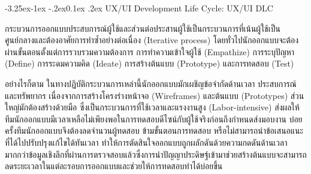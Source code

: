 \documentclass[a4paper,oneside]{cpe-thesis-th}
\makeatletter
\renewcommand\subsection{\@startsection{subsection}{2}{\z@}%
   {-3.25ex\@plus -1ex \@minus -.2ex}{0.1ex \@plus .2ex}%
   {\normalfont\thsz@subsection\bfseries}}
\newcommand{\thaijustify}[1]{%
  \par\hspace{30pt}\justifying
  #1
}
\makeatother
\begin{document}
\subsection{UX/UI Development Life Cycle: UX/UI DLC}
\thaijustify{
  กระบวนการออกแบบประสบการณ์ผู้ใช้และส่วนต่อประสานผู้ใช้เป็นกระบวนการที่เน้นผู้ใช้เป็นศูนย์กลางและต้องอาศัยการทำซ้ำอย่างต่อเนื่อง (Iterative process) โดยทั่วไปนักออกแบบจะต้องผ่านขั้นตอนตั้งแต่การรวบรวมความต้องการ การทำความเข้าใจผู้ใช้ (Empathize) การระบุปัญหา (Define) การระดมความคิด (Ideate) การสร้างต้นแบบ (Prototype) และการทดสอบ (Test)
} 
\thaijustify{อย่างไรก็ตาม ในทางปฏิบัติกระบวนการเหล่านี้นักออกแบบมักเผชิญข้อจำกัดด้านเวลา ประสบการณ์ และทรัพยากร เนื่องจากการสร้างโครงร่างหน้าจอ (Wireframes) และต้นแบบ (Prototypes) ส่วนใหญ่มักต้องสร้างด้วยมือ ซึ่งเป็นกระบวนการที่ใช้เวลาและแรงงานสูง (Labor-intensive) \cite{suh2025storyensemble} ส่งผลให้ทีมนักออกแบบมีเวลาเหลือไม่เพียงพอในการทดสอบดีไซน์กับผู้ใช้จริงก่อนถึงกำหนดส่งมอบงาน บ่อยครั้งทีมนักออกแบบจึงต้องลดจำนวนผู้ทดสอบ ข้ามขั้นตอนการทดสอบ หรือไม่สามารถนำข้อเสนอแนะที่ได้ไปปรับปรุงแก้ไขได้ทันเวลา ทำให้การตัดสินใจออกแบบถูกผลักดันด้วยความกดดันด้านเวลามากกว่าข้อมูลเชิงลึกที่ผ่านการตรวจสอบแล้วซึ่งการนำปัญญาประดิษฐ์เข้ามาช่วยสร้างต้นแบบจะสามารถลดระยะเวลาในแต่ละรอบการออกแบบและช่วยให้การทดสอบทำได้บ่อยขึ้น \cite{feng2023designing, yuan2024towards}
}
\end{document}
